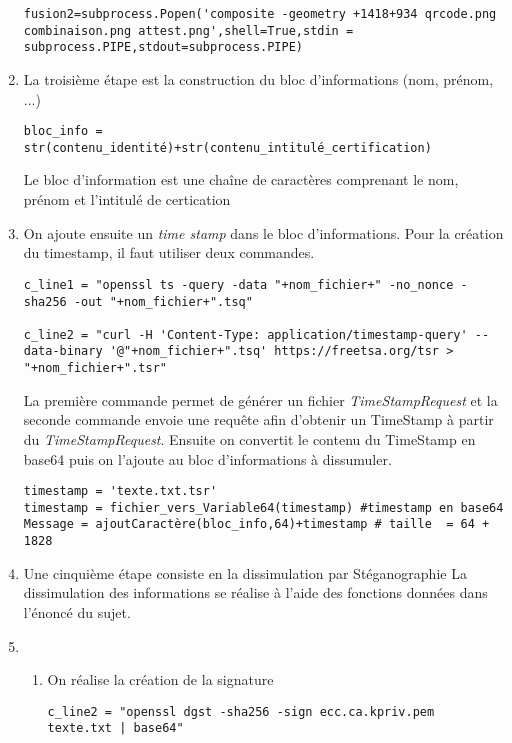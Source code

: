 \documentclass[12pt]{article}
\newcommand{\1}{\mathbbm{1}}
\begin{document}
\begin{enumerate}[label=(\arabic*)]
\begin{lstlisting}
fusion2=subprocess.Popen('composite -geometry +1418+934 qrcode.png combinaison.png attest.png',shell=True,stdin = subprocess.PIPE,stdout=subprocess.PIPE)
\end{lstlisting}		
\vspace*{7mm}
\item La troisième étape est la construction du bloc d'informations (nom, prénom, ...)

\begin{lstlisting}
bloc_info = str(contenu_identité)+str(contenu_intitulé_certification)
\end{lstlisting}
\vspace*{7mm}
Le bloc d'information est une chaîne de caractères comprenant le nom, prénom et l'intitulé de certication

\item On ajoute ensuite un \textit{time stamp} dans le bloc d'informations. Pour la création du timestamp, il faut utiliser deux commandes. 

\begin{lstlisting}
c_line1 = "openssl ts -query -data "+nom_fichier+" -no_nonce -sha256 -out "+nom_fichier+".tsq"
 
c_line2 = "curl -H 'Content-Type: application/timestamp-query' --data-binary '@"+nom_fichier+".tsq' https://freetsa.org/tsr > "+nom_fichier+".tsr"
\end{lstlisting}
\vspace*{7mm}
La première commande permet de générer un fichier \textit{TimeStampRequest} et la seconde commande envoie une requête afin d'obtenir un TimeStamp à partir du \textit{TimeStampRequest}. Ensuite on convertit le contenu du TimeStamp en base64 puis on l'ajoute au bloc d'informations à dissumuler.

\begin{lstlisting}
timestamp = 'texte.txt.tsr'
timestamp = fichier_vers_Variable64(timestamp) #timestamp en base64
Message = ajoutCaractère(bloc_info,64)+timestamp # taille  = 64 + 1828
\end{lstlisting}
\vspace*{7mm}
\item Une cinquième étape consiste en la dissimulation par Stéganographie \newline
La dissimulation des informations se réalise à l'aide des fonctions données dans l'énoncé du sujet.

\item

\begin{enumerate}[label=(\roman*)]
\item On réalise la création de la signature
\begin{lstlisting}
c_line2 = "openssl dgst -sha256 -sign ecc.ca.kpriv.pem texte.txt | base64" 
	

\end{lstlisting}
\end{enumerate}
\end{enumerate}
\end{document}
